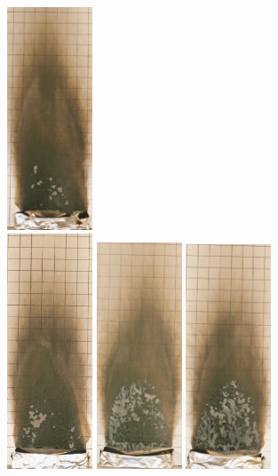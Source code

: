 \documentclass[twoside]{uocthesis}
\begin{document}
{\begin{figure}[p]
	\includegraphics[width=1.0in]{../Figures/GBPUF5_IMG_9390} \\

	\includegraphics[width=1.0in]{../Figures/GBPUF6_IMG_9403}
	\includegraphics[width=1.0in]{../Figures/GBPUF7_IMG_9416}
	\includegraphics[width=1.0in]{../Figures/GBPUF8_IMG_9429}

\end{figure}}
\end{document}

